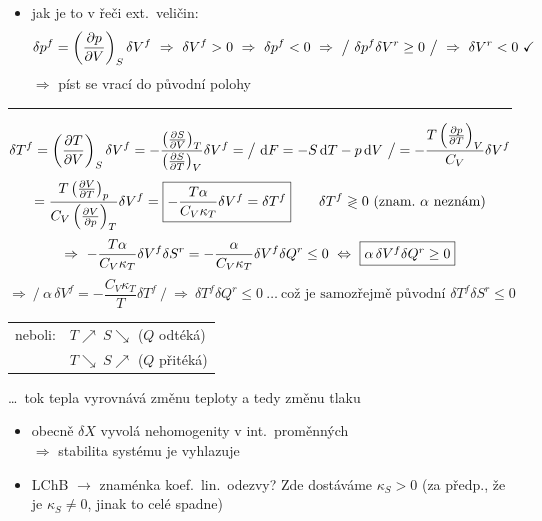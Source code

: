 \begingroup\color{NavyBlue}
\begin{itemize}
  \item jak je to v řeči ext.\ veličin:
  \[
    \delta p^f = \left(\pdv{p}{V}\right)_S\delta V^f \ \Rightarrow\ \delta V^f > 0 \ \Rightarrow\ \delta p^f < 0
    \ \Rightarrow\ \big/\ \delta p^f\delta V^r \geq 0\ \big/ \ \Rightarrow\ \delta V^r < 0 \ \checkmark
  \]
  $\Rightarrow$ píst se vrací do původní polohy
\end{itemize}
\begin{center}\rule{0.4\linewidth}{0.4pt}\end{center}
\[
  \delta T^f = \left(\pdv{T}{V}\right)_S\delta V^f = -\frac{\left(\pdv{S}{V}\right)_T}{\left(\pdv{S}{T}\right)_V}\delta V^f
  = \big/\ \dd F = -S\,\dd T - p\,\dd V\ \big/ = -\frac{T\left(\pdv{p}{T}\right)_V}{C_V}\delta V^f
\]
\[
  = \frac{T\left(\pdv{V}{T}\right)_p}{C_V\left(\pdv{V}{p}\right)_T}\delta V^f
  = \fbox{$-\dfrac{T\alpha}{C_V\kappa_T}\delta V^f = \delta T^f$}
  \qquad \delta T^f \gtrless 0 \ \text{(znam.\ $\alpha$ neznám)}
\]
\[
  \Rightarrow\ -\frac{T\alpha}{C_V\kappa_T}\delta V^f\delta S^r = -\frac{\alpha}{C_V\kappa_T}\delta V^f\delta Q^r \leq 0
  \ \Leftrightarrow\ \fbox{$\alpha\,\delta V^f\delta Q^r \geq 0$}
\]
\[
  \Rightarrow\ \Big/\ \alpha\,\delta V^f = -\frac{C_V\kappa_T}{T}\delta T^f\ \Big/ \ \Rightarrow\ \delta T^f\delta Q^r \leq 0
  \ \dots\ \text{což je samozřejmě původní } \delta T^f\delta S^r \leq 0
\]
\begin{tabular}{@{}ll}
neboli: & $T\nearrow\ S\searrow$ ($Q$ odtéká) \\
        & $T\searrow\ S\nearrow$ ($Q$ přitéká)
\end{tabular}
\quad \dots\ tok tepla vyrovnává změnu teploty a tedy změnu tlaku

\begin{itemize}
  \item obecně $\delta X$ vyvolá nehomogenity v int.\ proměnných \\
        $\Rightarrow$ stabilita systému je vyhlazuje
  \item LChB $\to$ znaménka koef.\ lin.\ odezvy? Zde dostáváme $\kappa_S > 0$ (za předp., že je $\kappa_S\neq0$, jinak to celé spadne)
\end{itemize}
\endgroup

